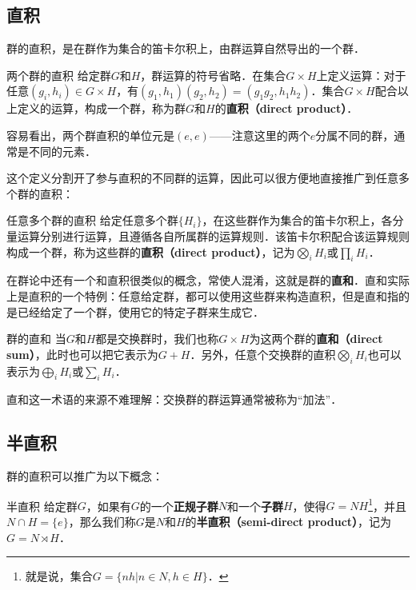 
\subsection{直积}

群的直积，是在群作为集合的笛卡尔积上，由群运算自然导出的一个群．

\begin{definition}{两个群的直积}
给定群$G$和$H$，群运算的符号省略．在集合$G\times H$上定义运算：对于任意$(g_i, h_i)\in G\times H$，有$(g_1, h_1)(g_2, h_2)=(g_1g_2, h_1h_2)$．集合$G\times H$配合以上定义的运算，构成一个群，称为群$G$和$H$的\textbf{直积（direct product）}．
\end{definition}

容易看出，两个群直积的单位元是$(e, e)$——注意这里的两个$e$分属不同的群，通常是不同的元素．

这个定义分割开了参与直积的不同群的运算，因此可以很方便地直接推广到任意多个群的直积：

\begin{definition}{任意多个群的直积}
给定任意多个群$\{H_i\}$，在这些群作为集合的笛卡尔积上，各分量运算分别进行运算，且遵循各自所属群的运算规则．该笛卡尔积配合该运算规则构成一个群，称为这些群的\textbf{直积（direct product）}，记为$\bigotimes_iH_i$或$\prod_iH_i$．
\end{definition}

在群论中还有一个和直积很类似的概念，常使人混淆，这就是群的\textbf{直和}．直和实际上是直积的一个特例：任意给定群，都可以使用这些群来构造直积，但是直和指的是已经给定了一个群，使用它的特定子群来生成它．

\begin{definition}{群的直和}
当$G$和$H$都是交换群时，我们也称$G\times H$为这两个群的\textbf{直和（direct sum）}，此时也可以把它表示为$G+H$．另外，任意个交换群的直积$\bigotimes_iH_i$也可以表示为$\bigoplus_iH_i$或$\sum_iH_i$．
\end{definition}

直和这一术语的来源不难理解：交换群的群运算通常被称为“加法”．

\subsection{半直积}

群的直积可以推广为以下概念：

\begin{definition}{半直积}
给定群$G$，如果有$G$的一个\textbf{正规子群}$N$和一个\textbf{子群}$H$，使得$G=NH$\footnote{就是说，集合$G=\{nh|n\in N, h\in H\}$．}，并且$N\cap H=\{e\}$，那么我们称$G$是$N$和$H$的\textbf{半直积（semi-direct product）}，记为$G=N\rtimes H$．
\end{definition}

